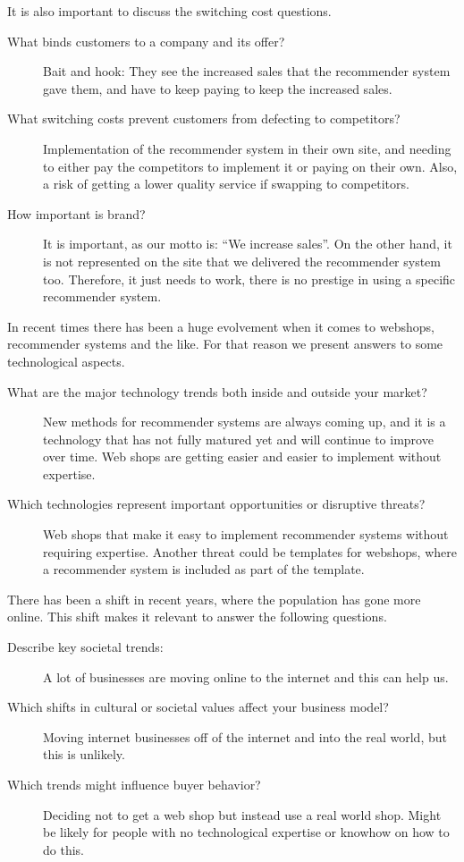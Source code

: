 It is also important to discuss the switching cost questions.
\begin{description}
	\item[What binds customers to a company and its offer?] Bait and hook: They see the increased sales that the recommender system gave them, and have to keep paying to keep the increased sales.
	\item[What switching costs prevent customers from defecting to competitors?] Implementation of the recommender system in their own site, and needing to either pay the competitors to implement it or paying on their own. Also, a risk of getting a lower quality service if swapping to competitors.
	\item[How important is brand?] It is important, as our motto is: “We increase sales”. On the other hand, it is not represented on the site that we delivered the recommender system too. Therefore, it just needs to work, there is no prestige in using a specific recommender system.
\end{description}


In recent times there has been a huge evolvement when it comes to webshops, recommender systems and the like. For that reason we present answers to some technological aspects.
\begin{description}
	\item[What are the major technology trends both inside and outside your market?] New methods for recommender systems are always coming up, and it is a technology that has not fully matured yet and will continue to improve over time. Web shops are getting easier and easier to implement without expertise.
	\item[Which technologies represent important opportunities or disruptive threats?] Web shops that make it easy to implement recommender systems without requiring expertise. Another threat could be templates for webshops, where a recommender system is included as part of the template. 
\end{description}

There has been a shift in recent years, where the population has gone more online.
This shift makes it relevant to answer the following questions.
\begin{description}
	\item[Describe key societal trends:] A lot of businesses are moving online to the internet and this can help us.
	\item[Which shifts in cultural or societal values affect your business model?] Moving internet businesses off of the internet and into the real world, but this is unlikely.
	\item[Which trends might influence buyer behavior?] Deciding not to get a web shop but instead use a real world shop. Might be likely for people with no technological expertise or knowhow on how to do this.
\end{description}